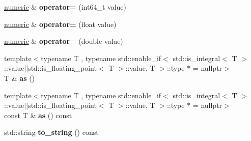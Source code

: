 \begin{DoxyCompactItemize}
\hyperlink{classdialog_1_1numeric}{numeric} \& {\bfseries operator=} (int64\+\_\+t value)
\item 
\mbox{\label{classdialog_1_1numeric_a71ab0faa34a90868535344f4fff01b7d}} 
\hyperlink{classdialog_1_1numeric}{numeric} \& {\bfseries operator=} (float value)
\item 
\mbox{\label{classdialog_1_1numeric_a59e33c522912527704f4f71634ee1a76}} 
\hyperlink{classdialog_1_1numeric}{numeric} \& {\bfseries operator=} (double value)
\item 
\mbox{\label{classdialog_1_1numeric_af419125dfd9391249aab3d078f25520d}} 
{\footnotesize template$<$typename T , typename std\+::enable\+\_\+if$<$ std\+::is\+\_\+integral$<$ T $>$\+::value$\vert$$\vert$std\+::is\+\_\+floating\+\_\+point$<$ T $>$\+::value, T $>$\+::type $\ast$  = nullptr$>$ }\\T \& {\bfseries as} ()
\item 
\mbox{\label{classdialog_1_1numeric_ad23a353a377901b005167816d6c36bbe}} 
{\footnotesize template$<$typename T , typename std\+::enable\+\_\+if$<$ std\+::is\+\_\+integral$<$ T $>$\+::value$\vert$$\vert$std\+::is\+\_\+floating\+\_\+point$<$ T $>$\+::value, T $>$\+::type $\ast$  = nullptr$>$ }\\const T \& {\bfseries as} () const
\item 
\mbox{\label{classdialog_1_1numeric_af1fe28e569b174798e2681a2c4d606e7}} 
std\+::string {\bfseries to\+\_\+string} () const
\end{DoxyCompactItemize}
